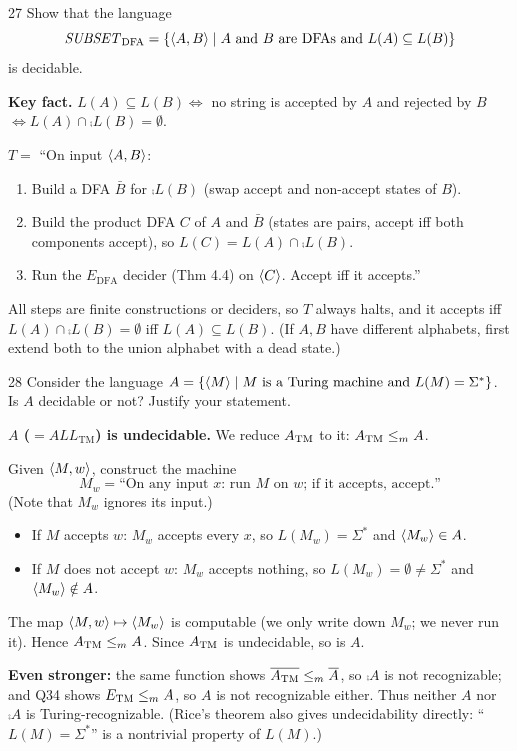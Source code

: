 \begin{question}{27}
Show that the language
\[\mathit{SUBSET}_{\mathrm{DFA}}=\{\langle A,B\rangle\mid A \text{ and } B \text{ are DFAs and } L(A)\subseteq L(B)\}\]
is decidable.
\end{question}
\begin{soln}
\textbf{Key fact.} $L(A)\subseteq L(B)\iff$ no string is accepted by $A$ and rejected by $B$ $\iff L(A)\cap\comp{L(B)}=\emptyset$.

$T=$ ``On input $\langle A,B\rangle$:
\begin{enumerate}
\item Build a DFA $\bar B$ for $\comp{L(B)}$ (swap accept and non-accept states of $B$).
\item Build the product DFA $C$ of $A$ and $\bar B$ (states are pairs, accept iff both components accept), so $L(C)=L(A)\cap\comp{L(B)}$.
\item Run the $E_{\mathrm{DFA}}$ decider (Thm 4.4) on $\langle C\rangle$. Accept iff it accepts.''
\end{enumerate}
All steps are finite constructions or deciders, so $T$ always halts, and it accepts iff $L(A)\cap\comp{L(B)}=\emptyset$ iff $L(A)\subseteq L(B)$. (If $A,B$ have different alphabets, first extend both to the union alphabet with a dead state.)
\end{soln}

\begin{question}{28}
Consider the language $A=\{\langle M\rangle\mid M \text{ is a Turing machine and } L(M)=\Sigma^*\}$. Is $A$ decidable or not? Justify your statement.
\end{question}
\begin{soln}
\textbf{$A$ ($=\mathit{ALL}_{\mathrm{TM}}$) is undecidable.} We reduce $A_{\mathrm{TM}}$ to it: $A_{\mathrm{TM}}\le_{m} A$.

Given $\langle M,w\rangle$, construct the machine
\[
M_w=\text{``On any input $x$: run $M$ on $w$; if it accepts, accept.''}
\]
(Note that $M_w$ ignores its input.)
\begin{itemize}
\item If $M$ accepts $w$: $M_w$ accepts every $x$, so $L(M_w)=\Sigma^*$ and $\langle M_w\rangle\in A$.
\item If $M$ does not accept $w$: $M_w$ accepts nothing, so $L(M_w)=\emptyset\neq\Sigma^*$ and $\langle M_w\rangle\notin A$.
\end{itemize}
The map $\langle M,w\rangle\mapsto\langle M_w\rangle$ is computable (we only write down $M_w$; we never run it). Hence $A_{\mathrm{TM}}\le_{m} A$. Since $A_{\mathrm{TM}}$ is undecidable, so is $A$.

\textbf{Even stronger:} the same function shows $\overline{A_{\mathrm{TM}}}\le_{m}\overline{A}$, so $\comp A$ is not recognizable; and Q34 shows $E_{\mathrm{TM}}\le_{m} A$, so $A$ is not recognizable either. Thus neither $A$ nor $\comp A$ is Turing-recognizable.
(Rice's theorem also gives undecidability directly: ``$L(M)=\Sigma^*$'' is a nontrivial property of $L(M)$.)
\end{soln}


